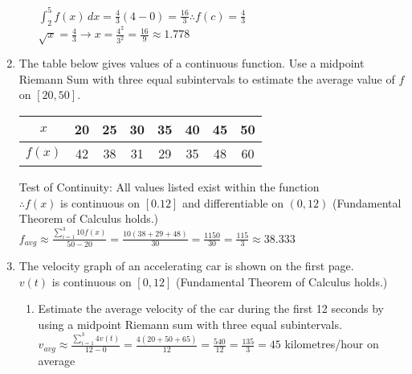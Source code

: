 \documentclass[10pt, letterpaper]{report}
\begin{document}
\begin{enumerate}
\begin{enumerate}
        $\int_{2}^{5}{f(x)}\,dx=\frac{4}{3}(4-0)=\frac{16}{3}\therefore f(c)=\frac{4}{3}$ \\

        $\sqrt{x}=\frac{4}{3}\rightarrow x=\frac{4^{2}}{3^{2}}=\frac{16}{9}\approx1.778$ \\

    \end{enumerate}
\pagebreak
  \item{The table below gives values of a continuous function. Use a midpoint Riemann Sum with three equal subintervals to estimate the average value of $f$ on $[20,50]$. \\
    \begin{center}
      \begin{tabular}{| c | c | c | c | c | c | c | c |}
        \hline
          $x$ & 20 & 25 & 30 & 35 & 40 & 45 & 50 \\
        \hline
          $f(x)$ & 42 & 38 & 31 & 29 & 35 & 48 & 60 \\
        \hline
      \end{tabular}
    \end{center}}

    Test of Continuity:
    All values listed exist within the function \\
    $\therefore f(x)$ is continuous on $[0.12]$ and differentiable on $(0,12)$ (Fundamental Theorem of Calculus holds.) \\

    $f_{avg}\approx
    \frac{\sum_{i=1}^{3}{10f(x)}}{50-20}=
    \frac{10(38+29+48)}{30}=
    \frac{1150}{30}=\frac{115}{3}\approx38.333$ \\
\hline
  \item{The velocity graph of an accelerating car is shown on the first page.} \\

    $v(t)$ is continuous on $[0,12]$ (Fundamental Theorem of Calculus holds.)

    \begin{enumerate}
      \item{Estimate the average velocity of the car during the first 12 seconds by using a midpoint Riemann sum with three equal subintervals.} \\

        $v_{avg}\approx
        \frac{\sum_{i=1}^{3}{4v(t)}}{12-0}=
        \frac{4(20+50+65)}{12}=
        \frac{540}{12}=
        \frac{135}{3}=45$ kilometres/hour on average \\


\end{enumerate}
\end{enumerate}
\end{document}
